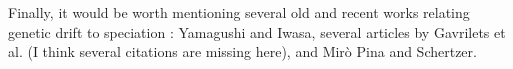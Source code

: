\reply{
}

\begin{point}{}
    Finally, it would be worth mentioning several old and recent works relating genetic drift
to speciation : Yamagushi and Iwasa, several articles by Gavrilets et al. (I think several
citations are missing here), and Mirò Pina and Schertzer.
\end{point}

\reply{
}





